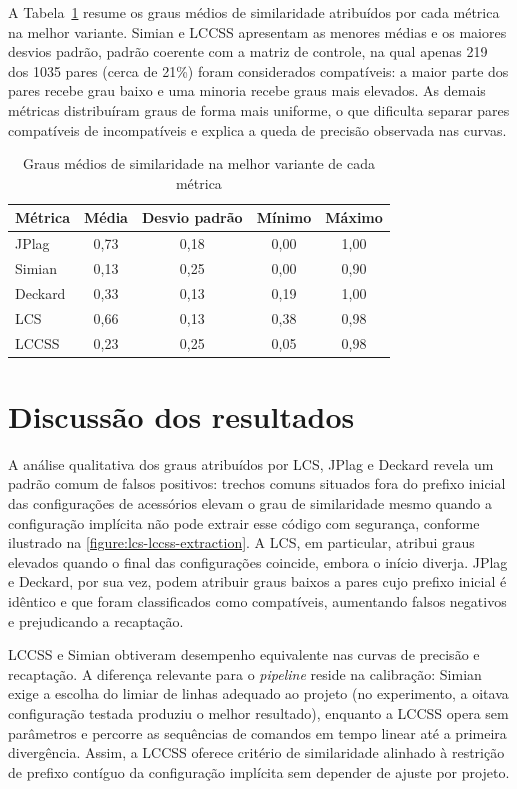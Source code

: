 A Tabela~\ref{table:average-similarity-degrees} resume os graus médios de similaridade atribuídos por cada métrica na melhor variante. Simian e LCCSS apresentam as menores médias e os maiores desvios padrão, padrão coerente com a matriz de controle, na qual apenas 219 dos 1035 pares (cerca de 21\%) foram considerados compatíveis: a maior parte dos pares recebe grau baixo e uma minoria recebe graus mais elevados. As demais métricas distribuíram graus de forma mais uniforme, o que dificulta separar pares compatíveis de incompatíveis e explica a queda de precisão observada nas curvas.

\begin{table}[htb]
	\centering
	\caption{Graus médios de similaridade na melhor variante de cada métrica}
	\label{table:average-similarity-degrees}
	\small
	\begin{tabular}{lcccc}
		\hline
		Métrica & Média & Desvio padrão & Mínimo & Máximo \\
		\hline
		JPlag & 0,73 & 0,18 & 0,00 & 1,00 \\
		Simian & 0,13 & 0,25 & 0,00 & 0,90 \\
		Deckard & 0,33 & 0,13 & 0,19 & 1,00 \\
		LCS & 0,66 & 0,13 & 0,38 & 0,98 \\
		LCCSS & 0,23 & 0,25 & 0,05 & 0,98 \\
		\hline
	\end{tabular}
\end{table}

\section{Discussão dos resultados}

A análise qualitativa dos graus atribuídos por LCS, JPlag e Deckard revela um padrão comum de falsos positivos: trechos comuns situados fora do prefixo inicial das configurações de acessórios elevam o grau de similaridade mesmo quando a configuração implícita não pode extrair esse código com segurança, conforme ilustrado na \autoref{figure:lcs-lccss-extraction}. A LCS, em particular, atribui graus elevados quando o final das configurações coincide, embora o início diverja. JPlag e Deckard, por sua vez, podem atribuir graus baixos a pares cujo prefixo inicial é idêntico e que foram classificados como compatíveis, aumentando falsos negativos e prejudicando a recaptação.

LCCSS e Simian obtiveram desempenho equivalente nas curvas de precisão e recaptação. A diferença relevante para o \textit{pipeline} reside na calibração: Simian exige a escolha do limiar de linhas adequado ao projeto (no experimento, a oitava configuração testada produziu o melhor resultado), enquanto a LCCSS opera sem parâmetros e percorre as sequências de comandos em tempo linear até a primeira divergência. Assim, a LCCSS oferece critério de similaridade alinhado à restrição de prefixo contíguo da configuração implícita sem depender de ajuste por projeto.

